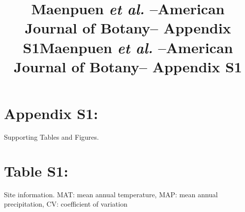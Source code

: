 \documentclass[
  12pt,
  a4paper,
,tablecaptionabove
]{scrartcl}
\title{Maenpuen \emph{et al.} --American Journal of Botany-- Appendix
S1}
\date{}
\title{Maenpuen \emph{et al.} --American Journal of Botany-- Appendix
S1}
\author{}
\begin{document}




{
\setcounter{tocdepth}{2}
\tableofcontents
}
\hypertarget{appendix-s1}{%
\section{Appendix S1:}\label{appendix-s1}}

Supporting Tables and Figures.

\newpage

\hypertarget{table-s1}{%
\section{Table S1:}\label{table-s1}}

Site information. MAT: mean annual temperature, MAP: mean annual
precipitation, CV: coefficient of variation
\end{document}
